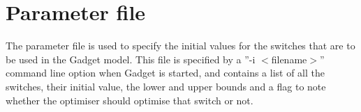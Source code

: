 \documentclass[10pt,titlepage]{article}
\begin{document}
{\small }

\section{Parameter file}

The parameter file is used to specify the initial values for the switches that are to be used in the Gadget model.  This file is specified by a ''-i $<$filename$>$'' command line option when Gadget is started, and  contains a list of all the switches, their initial value, the lower and upper bounds and a flag to note whether the optimiser should optimise that switch or not.

{\small }
\end{document}
